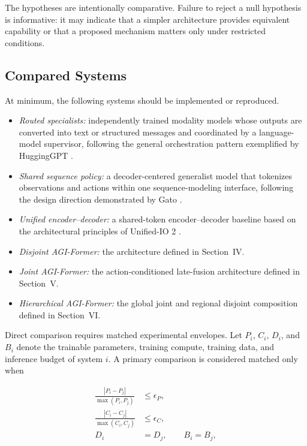 The hypotheses are intentionally comparative. Failure to reject a null hypothesis is informative: it may indicate that a simpler architecture provides equivalent capability or that a proposed mechanism matters only under restricted conditions.

\subsection{\textbf{Compared Systems}}

At minimum, the following systems should be implemented or reproduced.

\begin{itemize}
    \item \textit{Routed specialists:} independently trained modality models whose outputs are converted into text or structured messages and coordinated by a language-model supervisor, following the general orchestration pattern exemplified by HuggingGPT \cite{shen2023hugginggpt}.
    \item \textit{Shared sequence policy:} a decoder-centered generalist model that tokenizes observations and actions within one sequence-modeling interface, following the design direction demonstrated by Gato \cite{reed2022generalist}.
    \item \textit{Unified encoder--decoder:} a shared-token encoder--decoder baseline based on the architectural principles of Unified-IO 2 \cite{lu2024unifiedio2}.
    \item \textit{Disjoint AGI-Former:} the architecture defined in Section~IV.
    \item \textit{Joint AGI-Former:} the action-conditioned late-fusion architecture defined in Section~V.
    \item \textit{Hierarchical AGI-Former:} the global joint and regional disjoint composition defined in Section~VI.
\end{itemize}

Direct comparison requires matched experimental envelopes. Let $P_i$, $C_i$, $D_i$, and $B_i$ denote the trainable parameters, training compute, training data, and inference budget of system $i$. A primary comparison is considered matched only when

\begin{equation}
\begin{aligned}
    \frac{|P_i-P_j|}{\max(P_i,P_j)}&\leq\epsilon_P,\\
    \frac{|C_i-C_j|}{\max(C_i,C_j)}&\leq\epsilon_C,\\
    D_i&=D_j,
    \qquad
    B_i=B_j,
\end{aligned}
\label{eq:matched_budget}
\end{equation}


